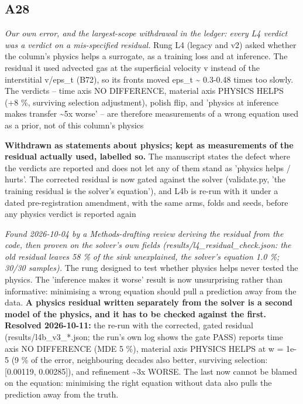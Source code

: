 \documentclass[10pt]{article}
\begin{document}
\subsection*{A28}\label{led:A28}
\begin{description}[leftmargin=0pt,itemsep=1pt]
\item[Claim withdrawn.] \emph{Our own error, and the largest-scope withdrawal in the ledger: every L4 verdict was a verdict on a mis-specified residual.} Rung L4 (legacy and v2) asked whether the column's physics helps a surrogate, as a training loss and at inference. The residual it used advected gas at the superficial velocity v instead of the interstitial v/eps\_t (B72), so its fronts moved eps\_t \textasciitilde{} 0.3-0.48 times too slowly. The verdicts -- time axis NO DIFFERENCE, material axis PHYSICS HELPS (+8 \%, surviving selection adjustment), polish flip, and 'physics at inference makes transfer \textasciitilde{}5x worse' -- are therefore measurements of a wrong equation used as a prior, not of this column's physics
\item[Replaced with.] \textbf{Withdrawn as statements about physics; kept as measurements of the residual actually used, labelled so.} The manuscript states the defect where the verdicts are reported and does not let any of them stand as 'physics helps / hurts'. The corrected residual is now gated against the solver (validate.py, 'the training residual is the solver's equation'), and L4b is re-run with it under a dated pre-registration amendment, with the same arms, folds and seeds, before any physics verdict is reported again
\item[Why it was wrong.] \emph{Found 2026-10-04 by a Methods-drafting review deriving the residual from the code, then proven on the solver's own fields (results/l4\_residual\_check.json: the old residual leaves 58 \% of the sink unexplained, the solver's equation 1.0 \%; 30/30 samples).} The rung designed to test whether physics helps never tested the physics. The 'inference makes it worse' result is now unsurprising rather than informative: minimising a wrong equation should pull a prediction away from the data. \textbf{A physics residual written separately from the solver is a second model of the physics, and it has to be checked against the first.} \textbf{Resolved 2026-10-11:} the re-run with the corrected, gated residual (results/l4b\_v3\_*.json; the run's own log shows the gate PASS) reports time axis NO DIFFERENCE (MDE 5 \%), material axis PHYSICS HELPS at w = 1e-5 (9 \% of the error, neighbouring decades also better, surviving selection: [0.00119, 0.00285]), and refinement \textasciitilde{}3x WORSE. The last now cannot be blamed on the equation: minimising the right equation without data also pulls the prediction away from the truth.
\end{description}
\end{document}

